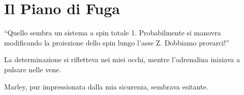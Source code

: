 \begin{center}
\begin{minipage}{0.7\textwidth}
    \centering
\end{minipage}
\end{center}

\section{Il Piano di Fuga}

\begin{dialogue}
 \enquote{Quello sembra un sistema a spin totale 1. Probabilmente si manovra modificando la proiezione dello spin lungo l’asse Z. Dobbiamo provarci!}
\end{dialogue}

La determinazione si rifletteva nei miei occhi, mentre l'adrenalina iniziava a pulsare nelle vene.

Marley, pur impressionata dalla mia sicurezza, sembrava esitante.

